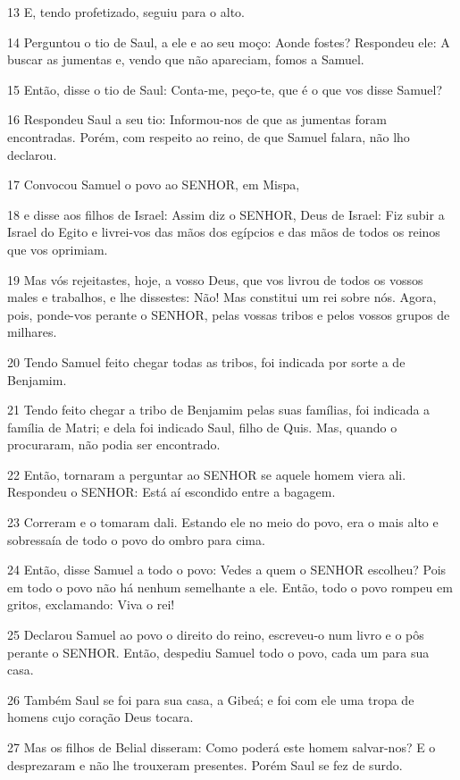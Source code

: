 \par 13 E, tendo profetizado, seguiu para o alto.
\par 14 Perguntou o tio de Saul, a ele e ao seu moço: Aonde fostes? Respondeu ele: A buscar as jumentas e, vendo que não apareciam, fomos a Samuel.
\par 15 Então, disse o tio de Saul: Conta-me, peço-te, que é o que vos disse Samuel?
\par 16 Respondeu Saul a seu tio: Informou-nos de que as jumentas foram encontradas. Porém, com respeito ao reino, de que Samuel falara, não lho declarou.
\par 17 Convocou Samuel o povo ao SENHOR, em Mispa,
\par 18 e disse aos filhos de Israel: Assim diz o SENHOR, Deus de Israel: Fiz subir a Israel do Egito e livrei-vos das mãos dos egípcios e das mãos de todos os reinos que vos oprimiam.
\par 19 Mas vós rejeitastes, hoje, a vosso Deus, que vos livrou de todos os vossos males e trabalhos, e lhe dissestes: Não! Mas constitui um rei sobre nós. Agora, pois, ponde-vos perante o SENHOR, pelas vossas tribos e pelos vossos grupos de milhares.
\par 20 Tendo Samuel feito chegar todas as tribos, foi indicada por sorte a de Benjamim.
\par 21 Tendo feito chegar a tribo de Benjamim pelas suas famílias, foi indicada a família de Matri; e dela foi indicado Saul, filho de Quis. Mas, quando o procuraram, não podia ser encontrado.
\par 22 Então, tornaram a perguntar ao SENHOR se aquele homem viera ali. Respondeu o SENHOR: Está aí escondido entre a bagagem.
\par 23 Correram e o tomaram dali. Estando ele no meio do povo, era o mais alto e sobressaía de todo o povo do ombro para cima.
\par 24 Então, disse Samuel a todo o povo: Vedes a quem o SENHOR escolheu? Pois em todo o povo não há nenhum semelhante a ele. Então, todo o povo rompeu em gritos, exclamando: Viva o rei!
\par 25 Declarou Samuel ao povo o direito do reino, escreveu-o num livro e o pôs perante o SENHOR. Então, despediu Samuel todo o povo, cada um para sua casa.
\par 26 Também Saul se foi para sua casa, a Gibeá; e foi com ele uma tropa de homens cujo coração Deus tocara.
\par 27 Mas os filhos de Belial disseram: Como poderá este homem salvar-nos? E o desprezaram e não lhe trouxeram presentes. Porém Saul se fez de surdo.

